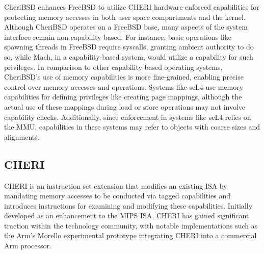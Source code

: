 CheriBSD enhances FreeBSD to utilize CHERI hardware-enforced capabilities for protecting memory accesses in both user space compartments 
and the kernel. Although CheriBSD operates on a FreeBSD base, many aspects of the system interface remain non-capability based. For instance, 
basic operations like spawning threads in FreeBSD require syscalls, granting ambient authority to do so, while Mach, in a capability-based system, 
would utilize a capability for such privileges. In comparison to other capability-based operating systems, CheriBSD's use of memory capabilities 
is more fine-grained, enabling precise control over memory accesses and operations. Systems like seL4 use memory capabilities for defining privileges 
like creating page mappings, although the actual use of these mappings during load or store operations may not involve capability checks. Additionally, 
since enforcement in systems like seL4 relies on the MMU, capabilities in these systems may refer to objects with coarse sizes and alignments.

\subsection{CHERI}


CHERI is an instruction set extension that modifies an existing ISA by mandating memory accesses to be conducted via tagged 
capabilities and introduces instructions for examining and modifying these capabilities. Initially developed as an 
enhancement to the MIPS ISA, CHERI has gained significant traction within the technology community, 
with notable implementations such as the Arm's Morello experimental prototype integrating CHERI into a 
commercial Arm processor.

